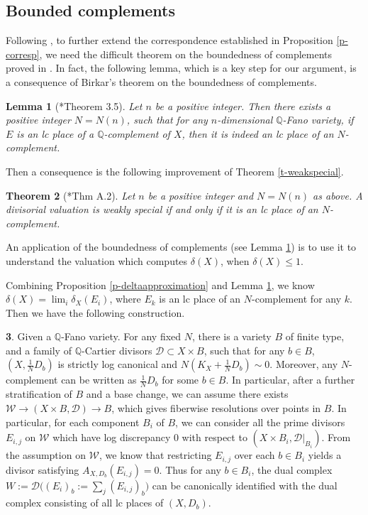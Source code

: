\documentclass[12pt,reqno]{amsart}%
\newcommand{\cW}{{\mathcal{W}}}
\newtheorem{thm}{Theorem}[section]
\newtheorem{lem}[thm]{Lemma}
\theoremstyle{definition}
\newtheorem{say}[thm]{}
\theoremstyle{remark}
\newcommand{\cD}{{\mathcal{D}}}
\newcommand{\bQ}{{\mathbb{Q}}}
\begin{document}
\subsection{Bounded complements} Following \cite{BLX19}, to further extend the correspondence established in Proposition \ref{p-corresp}, we need the difficult theorem on the boundedness of complements proved in \cite{Bir19}.  In fact, the following lemma, which is a key step for our argument, is a consequence of Birkar's theorem on the boundedness of complements.
\begin{lem}[{\cite{BLX19}*{Theorem 3.5}}]\label{l-complementbounded}
Let $n$ be a positive integer. Then there exists a positive integer $N = N(n)$, such that for any $n$-dimensional $\bQ$-Fano variety, if $E$ is an lc place of a $\bQ$-complement of $X$, then it is indeed an lc place of an $N$-complement. 
\end{lem}
Then a consequence is the following improvement of Theorem \ref{t-weakspecial}.
\begin{thm}[{\cite{BLX19}*{Thm A.2}}]\label{t-Nweakspecial}
Let $n$ be a positive integer and $N = N(n)$ as above. A divisorial valuation is weakly special if and only if it is an lc place of an $N$-complement. 
\end{thm}

An application of the boundedness of complements (see Lemma \ref{l-complementbounded}) is to use it to understand the valuation which computes $\delta(X)$, when $\delta(X)\le 1$.  

Combining Proposition \ref{p-deltaapproximation} and
 Lemma \ref{l-complementbounded}, we know $\delta(X)=\lim_i\delta_X(E_i)$, where $E_k$ is an lc place of an $N$-complement for any $k$. Then we have the following construction.

\begin{say}\label{say-stratification}
Given a $\bQ$-Fano variety. For any fixed $N$, there is a variety $B$ of finite type, and a family of $\mathbb{Q}$-Cartier divisors $\cD\subset X\times B$, such that for any $b\in B$, $(X,\frac{1}{N}D_b)$ is strictly log canonical and $N(K_X+\frac{1}{N}D_b)\sim 0$. Moreover, any $N$-complement can be written as $\frac{1}{N}D_b$ for some $b\in B$. In particular, after a further stratification of $B$ and a base change, we can assume there exists $\cW\to (X\times B,\cD)\to B$, which gives fiberwise resolutions over points in $B$. In particular, for each component $B_i$ of $B$, we can consider all the prime divisors $E_{i,j}$ on $\cW$ which have log discrepancy 0 with respect to $(X\times B_i, \cD|_{B_i})$. From the assumption on $\cW$, we know that restricting $E_{i,j}$ over each $b\in B_i$ yields a divisor satisfying $A_{X,D_b}(E_{i,j})=0$.  Thus  for any $b\in B_i$, the dual complex $W:=\cD\big((E_i)_b:=\sum_{j}(E_{i,j})_b\big)$ can be canonically identified with the dual complex consisting of all lc places of $(X,D_b)$.
\end{say}
\end{document}

